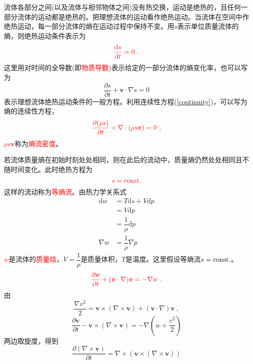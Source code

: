 \documentclass[12pt,a4paper]{article}
\renewcommand{\vec}[1]{\boldsymbol{#1}}
\newcommand{\dif}{\mathrm{d}}
\begin{document}
流体各部分之间(以及流体与相邻物体之间)没有热交换，运动是绝热的，且任何一部分流体的运动都是绝热的。把理想流体的运动看作绝热运动。当流体在空间中作绝热运动，每一部分流体的熵在运动过程中保持不变。用$s$表示单位质量流体的熵，则绝热运动条件表示为
\begin{equation}
\color{red} \frac{\dif s}{\dif t} = 0 ~.
\end{equation}
这里用对时间的全导数(即\textcolor{red}{物质导数})表示给定的一部分流体的熵变化率，也可以写为
\begin{equation*}
\frac{\partial s}{\partial t} +\vec{v} \cdot \nabla s = 0
\end{equation*}
表示理想流体绝热运动条件的一般方程。利用连续性方程(\ref{continuity})，可以写为熵的连续性方程，
\begin{align}
\color{red} \frac{\partial (\rho s)}{\partial t} + \nabla\cdot ( \rho s\vec{v}) = 0 ~,
\end{align}
\textcolor{red}{$\rho s\vec{v}$}称为\textcolor{red}{熵流密度}。

若流体质量熵在初始时刻处处相同，则在此后的流动中，质量熵仍然处处相同且不随时间变化。此时绝热方程为
\begin{equation}
\color{red} s  = {\rm const.}
\end{equation}
这样的流动称为\textcolor{red}{等熵流}。由热力学关系式
\begin{align*}
\dif w &= T\dif s +V\dif p \\
&= V\dif p \\
&= \dfrac{1}{\rho} \dif p \\
\nabla w &= \dfrac{1}{\rho}\nabla p
\end{align*}
\textcolor{red}{$w$}是流体的\textcolor{red}{质量焓}，$V = \dfrac{1}{\rho}$是质量体积，$T$是温度。这里假设等熵流$s  = {\rm const.}$。
\begin{equation}
\color{red} \frac{\partial \vec{v}}{\partial t} +(\vec{v} \cdot \nabla) \vec{v} = -\nabla w ~.
\end{equation}
由
\begin{equation*}
\frac{\nabla v^2}{2} = \vec{v} \times (\nabla \times \vec{v}) +(\vec{v} \cdot \nabla) \vec{v} ~,
\end{equation*}
\begin{equation*}
\frac{\partial \vec{v}}{\partial t} -\vec{v} \times (\nabla \times \vec{v}) = -\nabla \left( w +\frac{v^2}{2} \right)
\end{equation*}
两边取旋度，得到
\begin{equation}
\frac{\partial (\nabla \times \vec{v})}{\partial t} = \nabla \times(\vec{v} \times (\nabla \times \vec{v}) )
\end{equation}
\end{document}
